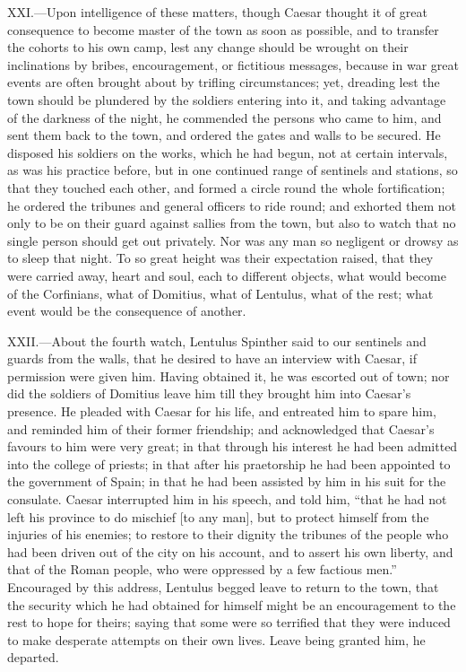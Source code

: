 XXI.—Upon intelligence of these matters, though Caesar thought it of
great consequence to become master of the town as soon as possible, and
to transfer the cohorts to his own camp, lest any change should be
wrought on their inclinations by bribes, encouragement, or fictitious
messages, because in war great events are often brought about by
trifling circumstances; yet, dreading lest the town should be plundered
by the soldiers entering into it, and taking advantage of the darkness
of the night, he commended the persons who came to him, and sent them
back to the town, and ordered the gates and walls to be secured. He
disposed his soldiers on the works, which he had begun, not at certain
intervals, as was his practice before, but in one continued range of
sentinels and stations, so that they touched each other, and formed a
circle round the whole fortification; he ordered the tribunes and
general officers to ride round; and exhorted them not only to be on
their guard against sallies from the town, but also to watch that no
single person should get out privately. Nor was any man so negligent or
drowsy as to sleep that night. To so great height was their expectation
raised, that they were carried away, heart and soul, each to different
objects, what would become of the Corfinians, what of Domitius, what of
Lentulus, what of the rest; what event would be the consequence of
another.

XXII.—About the fourth watch, Lentulus Spinther said to our sentinels
and guards from the walls, that he desired to have an interview with
Caesar, if permission were given him. Having obtained it, he was
escorted out of town; nor did the soldiers of Domitius leave him till
they brought him into Caesar's presence. He pleaded with Caesar for his
life, and entreated him to spare him, and reminded him of their former
friendship; and acknowledged that Caesar's favours to him were very
great; in that through his interest he had been admitted into the
college of priests; in that after his praetorship he had been appointed
to the government of Spain; in that he had been assisted by him in his
suit for the consulate. Caesar interrupted him in his speech, and told
him, ``that he had not left his province to do mischief [to any man], but
to protect himself from the injuries of his enemies; to restore to their
dignity the tribunes of the people who had been driven out of the city
on his account, and to assert his own liberty, and that of the Roman
people, who were oppressed by a few factious men.'' Encouraged by this
address, Lentulus begged leave to return to the town, that the security
which he had obtained for himself might be an encouragement to the rest
to hope for theirs; saying that some were so terrified that they were
induced to make desperate attempts on their own lives. Leave being
granted him, he departed.


